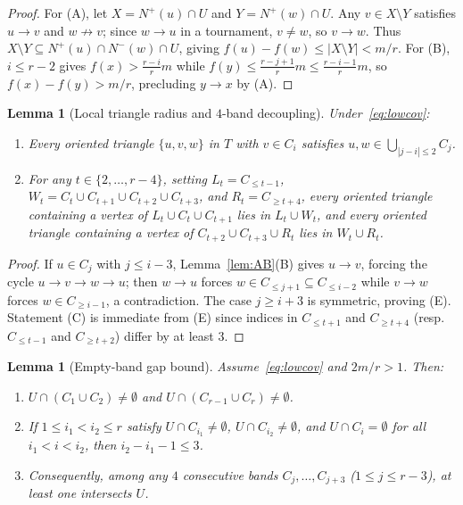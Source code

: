 \documentclass[11pt]{article}
\newtheorem{lemma}[theorem]{Lemma}
\theoremstyle{remark}
\begin{document}
\begin{proof}
For (A), let $X = N^+(u) \cap U$ and $Y = N^+(w) \cap U$. Any $v \in X \setminus Y$ satisfies $u \to v$ and $w \not\to v$; since $w \to u$ in a tournament, $v \ne w$, so $v \to w$. Thus $X \setminus Y \subseteq N^+(u) \cap N^-(w) \cap U$, giving $f(u) - f(w) \le |X \setminus Y| < m/r$. For (B), $i \le r - 2$ gives $f(x) > \frac{r - i}{r} m$ while $f(y) \le \frac{r - j + 1}{r} m \le \frac{r - i - 1}{r} m$, so $f(x) - f(y) > m/r$, precluding $y \to x$ by (A).
\end{proof}

\begin{lemma}[Local triangle radius and $4$-band decoupling]\label{lem:EC}
Under~\eqref{eq:lowcov}:
\begin{enumerate}
  \item[\emph{(E)}] Every oriented triangle $\{u, v, w\}$ in $T$ with $v \in C_i$ satisfies $u, w \in \bigcup_{|j - i| \le 2} C_j$.
  \item[\emph{(C)}] For any $t \in \{2, \dots, r - 4\}$, setting $L_t = C_{\le t-1}$, $W_t = C_t \cup C_{t+1} \cup C_{t+2} \cup C_{t+3}$, and $R_t = C_{\ge t+4}$, every oriented triangle containing a vertex of $L_t \cup C_t \cup C_{t+1}$ lies in $L_t \cup W_t$, and every oriented triangle containing a vertex of $C_{t+2} \cup C_{t+3} \cup R_t$ lies in $W_t \cup R_t$.
\end{enumerate}
\end{lemma}

\begin{proof}
If $u \in C_j$ with $j \le i - 3$, Lemma~\ref{lem:AB}(B) gives $u \to v$, forcing the cycle $u \to v \to w \to u$; then $w \to u$ forces $w \in C_{\le j+1} \subseteq C_{\le i-2}$ while $v \to w$ forces $w \in C_{\ge i-1}$, a contradiction. The case $j \ge i + 3$ is symmetric, proving (E). Statement (C) is immediate from (E) since indices in $C_{\le t+1}$ and $C_{\ge t+4}$ (resp.\ $C_{\le t-1}$ and $C_{\ge t+2}$) differ by at least $3$.
\end{proof}

\begin{lemma}[Empty-band gap bound]\label{lem:D}
Assume~\eqref{eq:lowcov} and $2m/r > 1$. Then:
\begin{enumerate}
  \item $U \cap (C_1 \cup C_2) \ne \emptyset$ and $U \cap (C_{r-1} \cup C_r) \ne \emptyset$.
  \item If $1 \le i_1 < i_2 \le r$ satisfy $U \cap C_{i_1} \ne \emptyset$, $U \cap C_{i_2} \ne \emptyset$, and $U \cap C_i = \emptyset$ for all $i_1 < i < i_2$, then $i_2 - i_1 - 1 \le 3$.
  \item Consequently, among any $4$ consecutive bands $C_j, \dots, C_{j+3}$ ($1 \le j \le r - 3$), at least one intersects $U$.
\end{enumerate}
\end{lemma}
\end{document}
